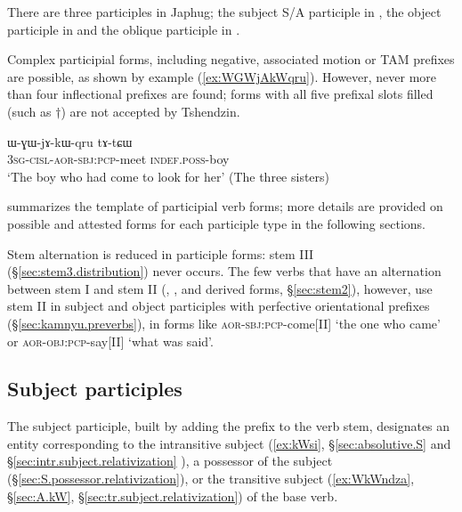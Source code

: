 There are three participles in Japhug; the subject S/A participle in , the object participle in  and the oblique participle in . 

Complex participial forms, including negative, associated motion or TAM prefixes are possible, as shown by example (\ref{ex:WGWjAkWqru}). However, never more than four inflectional prefixes are found; forms with all five prefixal slots filled (such as $\dagger$) are not accepted by Tshendzin.

 \begin{exe}
\ex \label{ex:WGWjAkWqru}
\gll ɯ-ɣɯ-jɤ-kɯ-qru tɤ-tɕɯ  \\
  \textsc{3sg}-\textsc{cisl}-\textsc{aor}-\textsc{sbj}:\textsc{pcp}-meet \textsc{indef}.\textsc{poss}-boy   \\
\glt `The boy who had come to look for her' (The three sisters)
 \end{exe}

 summarizes the template of participial verb forms; more details are provided on possible and attested forms for each participle type in the following sections.

\begin{table}[h]
\caption{The template of participial verb forms in Japhug} \centering \label{tab:template.nmlz}
\end{table}

Stem alternation is reduced in participle forms: stem III (§\ref{sec:stem3.distribution}) never occurs. The few verbs that have an alternation between stem I and stem II (, ,  and derived forms, §\ref{sec:stem2}), however, use stem II in subject and object participles with perfective orientational prefixes (§\ref{sec:kamnyu.preverbs}), in forms like  \textsc{aor}-\textsc{sbj}:\textsc{pcp}-come[II] `the one who came'
or  \textsc{aor}-\textsc{obj}:\textsc{pcp}-say[II] `what was said'.
 
\subsection{Subject participles} \label{sec:subject.participles}
The subject participle, built by adding the prefix  to the verb stem, designates an entity corresponding to the intransitive subject (\ref{ex:kWsi}, §\ref{sec:absolutive.S} and §\ref{sec:intr.subject.relativization} ), a possessor of the subject (§\ref{sec:S.possessor.relativization}), or the transitive subject (\ref{ex:WkWndza}, §\ref{sec:A.kW}, §\ref{sec:tr.subject.relativization}) of the base verb. 

